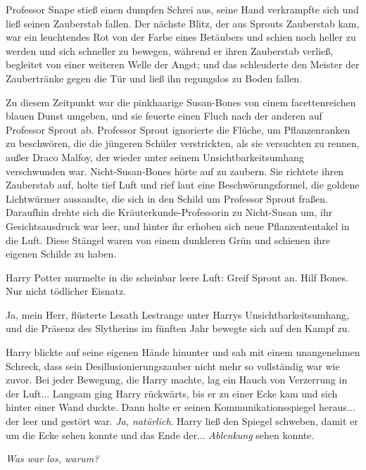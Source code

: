 Professor Snape stieß einen dumpfen Schrei aus, seine Hand verkrampfte sich und
ließ seinen Zauberstab fallen. Der nächste Blitz, der aus Sprouts Zauberstab
kam, war ein leuchtendes Rot von der Farbe eines Betäubers und schien noch
heller zu werden und sich schneller zu bewegen, während er ihren Zauberstab
verließ, begleitet von einer weiteren Welle der Angst; und das schleuderte den
Meister der Zaubertränke gegen die Tür und ließ ihn regungslos zu Boden fallen.

Zu diesem Zeitpunkt war die pinkhaarige Susan-Bones von einem facettenreichen
blauen Dunst umgeben, und sie feuerte einen Fluch nach der anderen auf Professor
Sprout ab. Professor Sprout ignorierte die Flüche, um Pflanzenranken zu
beschwören, die die jüngeren Schüler verstrickten, als sie versuchten zu rennen,
außer Draco Malfoy, der wieder unter seinem Unsichtbarkeitsumhang verschwunden
war. Nicht-Susan-Bones hörte auf zu zaubern. Sie richtete ihren Zauberstab auf,
holte tief Luft und rief laut eine Beschwörungsformel, die goldene Lichtwürmer
aussandte, die sich in den Schild um Professor Sprout fraßen. Daraufhin drehte
sich die Kräuterkunde-Professorin zu Nicht-Susan um, ihr Gesichtsausdruck war
leer, und hinter ihr erhoben sich neue Pflanzententakel in die Luft. Diese
Stängel waren von einem dunkleren Grün und schienen ihre eigenen Schilde zu
haben.

Harry Potter murmelte in die scheinbar leere Luft: \glqq{}Greif Sprout an. Hilf
Bones. Nur nicht tödlicher Eisnatz.\grqq{}

\glqq{}Ja, mein Herr\grqq{}, flüsterte Lesath Lestrange unter Harrys
Unsichtbarkeitsumhang, und die Präsenz des Slytherins im fünften Jahr bewegte
sich auf den Kampf zu.

Harry blickte auf seine eigenen Hände hinunter und sah mit einem unangenehmen
Schreck, dass sein Desillusionierungszauber nicht mehr so vollständig war wie
zuvor. Bei jeder Bewegung, die Harry machte, lag ein Hauch von Verzerrung in der
Luft... Langsam ging Harry rückwärts, bis er zu einer Ecke kam und sich hinter
einer Wand duckte. Dann holte er seinen Kommunikationsspiegel heraus... der leer
und gestört war. \emph{Ja, natürlich}. Harry ließ den Spiegel schweben, damit er
um die Ecke sehen konnte und das Ende der... \emph{Ablenkung} sehen konnte.

\emph{Was war los, warum?}

